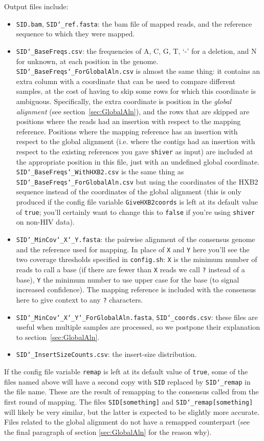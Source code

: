 \documentclass{article}
\newcommand{\shiv}{\c{shiver}\xspace}
\let\c\texttt
\begin{document}
Output files include:
\begin{itemize}
\item \c{SID.bam}, \c{SID\char`_ref.fasta}: the bam file of mapped reads, and the reference sequence to which they were mapped.
\item \c{SID\char`_BaseFreqs.csv}: the frequencies of A, C, G, T, `-' for a deletion, and N for unknown, at each position in the genome.
\c{SID\char`_BaseFreqs\char`_ForGlobalAln.csv} is almost the same thing: it contains an extra column with a coordinate that can be used to compare different samples, at the cost of having to skip some rows for which this coordinate is ambiguous.
Specifically, the extra coordinate is position in the {\it global alignment} (see section~\ref{sec:GlobalAln}), and the rows that are skipped are positions where the reads had an insertion with respect to the mapping reference.
Positions where the mapping reference has an insertion with respect to the global alignment (i.e. where the contigs had an insertion with respect to the existing references you gave \shiv as input) are included at the appropriate position in this file, just with an undefined global coordinate.
\c{SID\char`_BaseFreqs\char`_WithHXB2.csv} is the same thing as \c{SID\char`_BaseFreqs\char`_ForGlobalAln.csv} but using the coordinates of the HXB2 sequence instead of the coordinates of the global alignment (this is only produced if the config file variable \c{GiveHXB2coords} is left at its default value of \c{true}; you'll certainly want to change this to \c{false} if you're using \shiv on non-HIV data).
\item \c{SID\char`_MinCov\char`_X\char`_Y.fasta}: the pairwise alignment of the consensus genome and the reference used for mapping.
In place of \c{X} and \c{Y} here you'll see the two coverage thresholds specified in \c{config.sh}: \c{X} is the minimum number of reads to call a base (if there are fewer than \c{X} reads we call \c{?} instead of a base), \c{Y} the minimum number to use upper case for the base (to signal increased confidence).
The mapping reference is included with the consensus here to give context to any \c{?} characters.
\item \c{SID\char`_MinCov\char`_X\char`_Y\char`_ForGlobalAln.fasta}, \c{SID\char`_coords.csv}: these files are useful when multiple samples are processed, so we postpone their explanation to section~\ref{sec:GlobalAln}.  
\item \c{SID\char`_InsertSizeCounts.csv}: the insert-size distribution.
\end{itemize}
If the config file variable \c{remap} is left at its default value of \c{true}, some of the files named above will have a second copy with \c{SID} replaced by \c{SID\char`_remap} in the file name.
These are the result of remapping to the consensus called from the first round of mapping.
The files \c{SID[something]} and \c{SID\char`_remap[something]} will likely be very similar, but the latter is expected to be slightly more accurate.
Files related to the global alignment do not have a remapped counterpart (see the final paragraph of section \ref{sec:GlobalAln} for the reason why).
\end{document}
